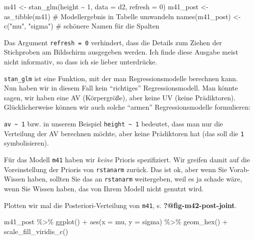 \documentclass[
  a4paper,
  DIV=11]{scrreprt}
\newenvironment{Shaded}{\begin{snugshade}}{\end{snugshade}}
\newcommand{\AttributeTok}[1]{\textcolor[rgb]{0.40,0.45,0.13}{#1}}
\newcommand{\CommentTok}[1]{\textcolor[rgb]{0.37,0.37,0.37}{#1}}
\newcommand{\DecValTok}[1]{\textcolor[rgb]{0.68,0.00,0.00}{#1}}
\newcommand{\FunctionTok}[1]{\textcolor[rgb]{0.28,0.35,0.67}{#1}}
\newcommand{\NormalTok}[1]{\textcolor[rgb]{0.00,0.23,0.31}{#1}}
\newcommand{\OtherTok}[1]{\textcolor[rgb]{0.00,0.23,0.31}{#1}}
\newcommand{\SpecialCharTok}[1]{\textcolor[rgb]{0.37,0.37,0.37}{#1}}
\newcommand{\StringTok}[1]{\textcolor[rgb]{0.13,0.47,0.30}{#1}}
\theoremstyle{definition}
\theoremstyle{remark}
\begin{document}
\begin{Shaded}
\begin{Highlighting}[]
\NormalTok{m41 }\OtherTok{\textless{}{-}} \FunctionTok{stan\_glm}\NormalTok{(height }\SpecialCharTok{\textasciitilde{}} \DecValTok{1}\NormalTok{, }\AttributeTok{data =}\NormalTok{ d2, }\AttributeTok{refresh =} \DecValTok{0}\NormalTok{)}
\NormalTok{m41\_post }\OtherTok{\textless{}{-}} \FunctionTok{as\_tibble}\NormalTok{(m41)  }\CommentTok{\# Modellergebnis in Tabelle umwandeln}
\FunctionTok{names}\NormalTok{(m41\_post) }\OtherTok{\textless{}{-}} \FunctionTok{c}\NormalTok{(}\StringTok{"mu"}\NormalTok{, }\StringTok{"sigma"}\NormalTok{)  }\CommentTok{\# schönere Namen für die Spalten}
\end{Highlighting}
\end{Shaded}

Das Argument \texttt{refresh\ =\ 0} verhindert, dass die Details zum
Ziehen der Stichproben am Bildschirm ausgegeben werden. Ich finde diese
Ausgabe meist nicht informativ, so dass ich sie lieber unterdrücke.

\texttt{stan\_glm} ist eine Funktion, mit der man Regressionsmodelle
berechnen kann. Nun haben wir in diesem Fall kein ``richtiges''
Regressionsmodell. Man könnte sagen, wir haben eine AV (Körpergröße),
aber keine UV (keine Prädiktoren). Glücklicherweise können wir auch
solche ``armen'' Regressionsmodelle formulieren:

\texttt{av\ \textasciitilde{}\ 1} bzw. in unserem Beispiel
\texttt{height\ \textasciitilde{}\ 1} bedeutet, dass man nur die
Verteilung der AV berechnen möchte, aber keine Prädiktoren hat (das soll
die \texttt{1} symbolisieren).

Für das Modell \texttt{m41} haben wir \emph{keine} Prioris spezifiziert.
Wir greifen damit auf die Voreinstellung der Prioris von
\texttt{rstanarm} zurück. Das ist ok, aber wenn Sie Vorab-Wissen haben,
sollten Sie das an \texttt{rstanarm} weitergeben, weil es ja schade
wäre, wenn Sie Wissen haben, das von Ihrem Modell nicht genutzt wird.

Plotten wir mal die Posteriori-Verteilung von \texttt{m41}, s.
\textbf{?@fig-m42-post-joint}.

\begin{Shaded}
\begin{Highlighting}[]
\NormalTok{m41\_post }\SpecialCharTok{\%\textgreater{}\%} 
  \FunctionTok{ggplot}\NormalTok{() }\SpecialCharTok{+}
  \FunctionTok{aes}\NormalTok{(}\AttributeTok{x =}\NormalTok{ mu, }\AttributeTok{y =}\NormalTok{ sigma) }\SpecialCharTok{\%\textgreater{}\%} 
  \FunctionTok{geom\_hex}\NormalTok{() }\SpecialCharTok{+}
  \FunctionTok{scale\_fill\_viridis\_c}\NormalTok{() }
\end{Highlighting}
\end{Shaded}
\end{document}
